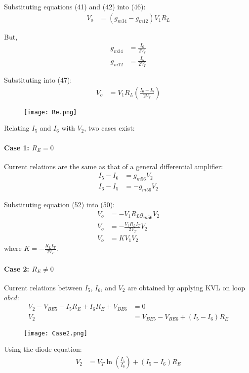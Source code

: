 \documentclass[a4paper,9pt,twoside,openany,twocolumn]{memoir}
\begin{document}
Substituting equations (41) and (42) into (46):
\begin{align}
V_o &= (g_{m34} - g_{m12}) V_1 R_L \tag{47}
\end{align}

But,
\begin{align}
g_{m34} &= \frac{I_6}{2V_T} \tag{48} \\
g_{m12} &= \frac{I_5}{2V_T} \tag{49}
\end{align}

Substituting into (47):
\begin{align}
V_o &= V_1 R_L \left(\frac{I_6 - I_5}{2V_T}\right) \tag{50}
\end{align}
\begin{figure}[h]
    \centering
    \texttt{[image: Re.png]} %
    \caption{}
    \label{fig:Re}
\end{figure}
Relating \( I_5 \) and \( I_6 \) with \( V_2 \), two cases exist:

\paragraph{Case 1: \( R_E = 0 \)}
Current relations are the same as that of a general differential amplifier:
\begin{align}
I_5 - I_6 &= g_{m56} V_2 \tag{51} \\
I_6 - I_5 &= -g_{m56} V_2 \tag{52}
\end{align}

Substituting equation (52) into (50):
\begin{align}
V_o &= -V_1 R_L g_{m56} V_2 \tag{53} \\
V_o &= -\frac{V_1 R_L I_T}{2V_T} V_2 \tag{54} \\
V_o &= K V_1 V_2 \tag{55}
\end{align}
where \( K = -\frac{R_L I_T}{2V_T} \).

\paragraph{Case 2: \( R_E \neq 0 \)}
Current relations between \( I_5 \), \( I_6 \), and \( V_2 \) are obtained by applying KVL on loop \( abcd \):
\begin{align}
V_2 - V_{BE5} - I_5 R_E + I_6 R_E + V_{BE6} &= 0 \tag{56} \\
V_2 &= V_{BE5} - V_{BE6} + (I_5 - I_6) R_E \tag{57}
\end{align}
\begin{figure}[h]
    \centering
    \texttt{[image: Case2.png]} %
    \caption{}
    \label{fig:Case2}
\end{figure}
Using the diode equation:
\begin{align}
V_2 &= V_T \ln\left(\frac{I_5}{I_6}\right) + (I_5 - I_6) R_E \tag{58}
\end{align}
\end{document}
